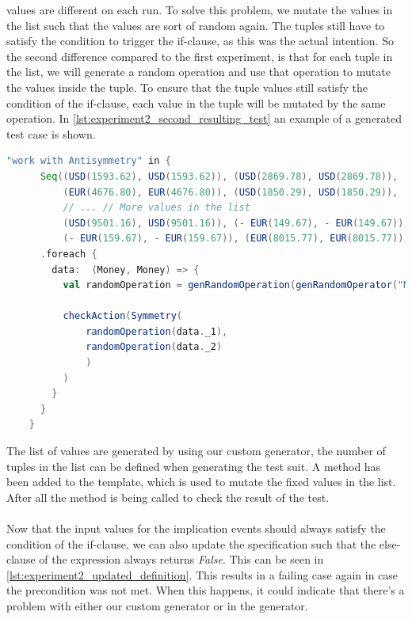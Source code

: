 values are different on each run. To solve this problem, we mutate the values in
the list such that the values are sort of random again. The tuples still have to
satisfy the condition to trigger the if-clause, as this was the actual
intention. So the second difference compared to the first experiment, is that
for each tuple in the list, we will generate a random operation and use that
operation to mutate the values inside the tuple. To ensure that the tuple values
still satisfy the condition of the if-clause, each value in the tuple will be
mutated by the same operation. In
\autoref{lst:experiment2_second_resulting_test} an example of a generated test
case is shown.
\FloatBarrier
\begin{sourcecode}[!ht]
\begin{lstlisting}[language=Scala]
"work with Antisymmetry" in {
      Seq((USD(1593.62), USD(1593.62)), (USD(2869.78), USD(2869.78)),
          (EUR(4676.80), EUR(4676.80)), (USD(1850.29), USD(1850.29)),
          // ... // More values in the list
          (USD(9501.16), USD(9501.16)), (- EUR(149.67), - EUR(149.67)),
          (- EUR(159.67), - EUR(159.67)), (EUR(8015.77), EUR(8015.77)))
      .foreach {
        data:  (Money, Money) => {
          val randomOperation = genRandomOperation(genRandomOperator("Money", true), generateRandomMoney(data._1.currency), generateRandomInteger(true), generateRandomInteger(false), generateRandomPercentage(true), generateRandomPercentage(false), Random.nextInt(10))

          checkAction(Symmetry(
              randomOperation(data._1),
              randomOperation(data._2)
              )
          )
        }
      }
    }
\end{lstlisting}
\caption{Resulting test case with semi-random values. Omitted some input tuples for readability.}
\label{lst:experiment2_second_resulting_test}
\end{sourcecode}
\FloatBarrier
The list of values are generated by using our custom generator, the number of
tuples in the list can be defined when generating the test suit. A method
 has been added to the template, which is used to
mutate the fixed values in the list. After all the  method
is being called to check the result of the test.\\
\\
Now that the input values for the implication events should always satisfy the
condition of the if-clause, we can also update the specification such that the
else-clause of the expression always returns \textit{False}. This can be seen in
\autoref{lst:experiment2_updated_definition}. This results in a failing case
again in case the precondition was not met. When this happens, it could indicate
that there's a problem with either our custom generator or in the generator.

